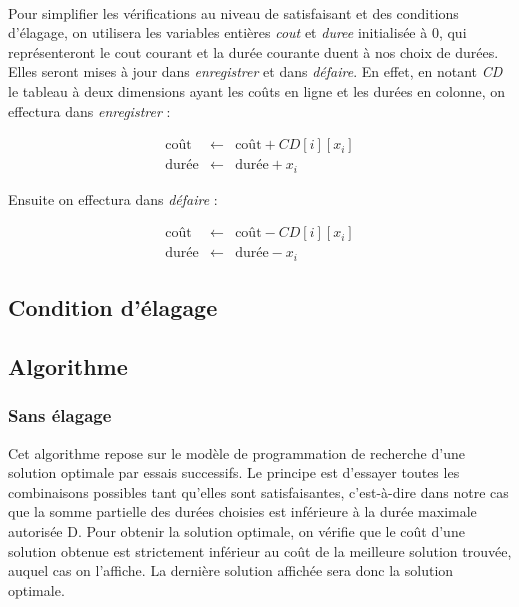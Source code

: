 \documentclass[a4paper, titlepage]{article}
\begin{document}
		\paragraph{}
		Pour simplifier les vérifications au niveau de satisfaisant et des conditions d'élagage, on utilisera les variables entières \emph{cout} et \emph{duree} initialisée à 0,
		qui représenteront le cout courant et la durée courante duent à nos choix de durées.
		Elles seront mises à jour dans \emph{enregistrer} et dans \emph{défaire}.
		En effet, en notant \emph{CD} le tableau à deux dimensions ayant les coûts en ligne et les durées en colonne, on effectura dans \emph{enregistrer} :

			\begin{eqnarray*}
				\mbox{coût}  & \leftarrow & \mbox{coût} + CD[i][x_{i}] \\
				\mbox{durée} & \leftarrow & \mbox{durée} + x_{i}
			\end{eqnarray*}

		Ensuite on effectura dans \emph{défaire} :

			\begin{eqnarray*}
				\mbox{coût}  & \leftarrow & \mbox{coût} - CD[i][x_{i}] \\
				\mbox{durée} & \leftarrow & \mbox{durée} - x_{i}
			\end{eqnarray*}

	\subsection{Condition d'élagage}


	\subsection{Algorithme}

		\subsubsection{Sans élagage}

			Cet algorithme repose sur le modèle de programmation de recherche d'une solution optimale par essais successifs.
			Le principe est d'essayer toutes les combinaisons possibles tant qu'elles sont satisfaisantes, c'est-à-dire dans notre cas que la somme partielle des durées choisies est inférieure à la durée maximale autorisée D.
			Pour obtenir la solution optimale, on vérifie que le coût d'une solution obtenue est strictement inférieur au coût de la meilleure solution trouvée, auquel cas on l'affiche.
			La dernière solution affichée sera donc la solution optimale.
\end{document}
